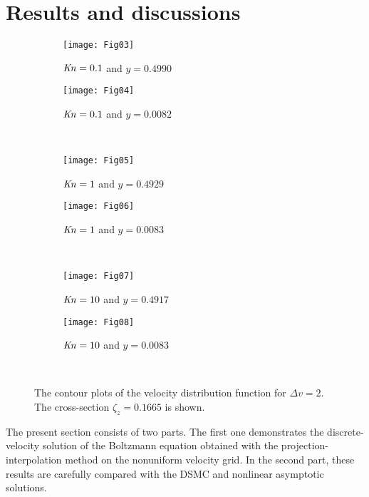 \documentclass[final]{jfm} %
\newcommand{\Kn}{\mbox{\textit{Kn}}}
\begin{document}
\section{Results and discussions}

\begin{figure}
    \centering
    \begin{subfigure}[b]{.5\linewidth}
        \texttt{[image: Fig03]}
        \caption{\(\Kn=0.1\) and \(y=0.4990\)}
        \label{fig:distrib-kn0.1:boundary}
    \end{subfigure}%
    \begin{subfigure}[b]{.5\linewidth}
        \texttt{[image: Fig04]}
        \caption{\(\Kn=0.1\) and \(y=0.0082\)}
        \label{fig:distrib-kn0.1:center}
    \end{subfigure}\\
    \begin{subfigure}[b]{.5\linewidth}
        \texttt{[image: Fig05]}
        \caption{\(\Kn=1\) and \(y=0.4929\)}
        \label{fig:distrib-kn1.0:boundary}
    \end{subfigure}%
    \begin{subfigure}[b]{.5\linewidth}
        \texttt{[image: Fig06]}
        \caption{\(\Kn=1\) and \(y=0.0083\)}
        \label{fig:distrib-kn1.0:center}
    \end{subfigure}\\
    \begin{subfigure}[b]{.5\linewidth}
        \texttt{[image: Fig07]}
        \caption{\(\Kn=10\) and \(y=0.4917\)}
        \label{fig:distrib-kn10:boundary}
    \end{subfigure}%
    \begin{subfigure}[b]{.5\linewidth}
        \texttt{[image: Fig08]}
        \caption{\(\Kn=10\) and \(y=0.0083\)}
        \label{fig:distrib-kn10:center}
    \end{subfigure}\\
    \caption{The contour plots of the velocity distribution function for \(\Delta{v}=2\).
        The cross-section \(\zeta_z=0.1665\) is shown.}
    \label{fig:distrib}
\end{figure}

The present section consists of two parts.
The first one demonstrates the discrete-velocity solution of the Boltzmann equation
obtained with the projection-interpolation method on the nonuniform velocity grid.
In the second part, these results are carefully compared with the DSMC and nonlinear asymptotic solutions.
\end{document}

